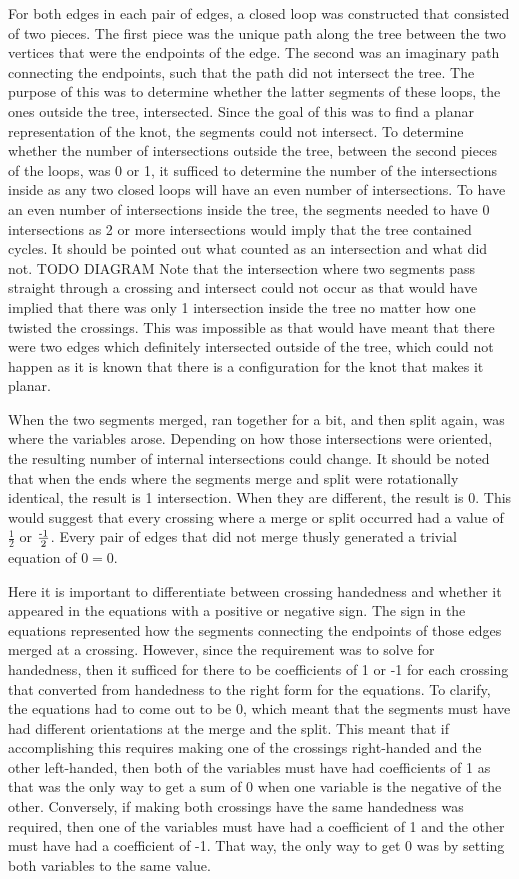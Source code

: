 \begin{paper}
For both edges in each pair of edges, a closed loop was constructed that
consisted of two pieces.
The first piece was the unique path along the tree between the two vertices that
were the endpoints of the edge.
The second was an imaginary path connecting the endpoints, such that the path
did not intersect the tree.
The purpose of this was to determine whether the latter segments of these loops,
the ones outside the tree, intersected.
Since the goal of this was to find a planar representation of the knot, the
segments could not intersect.
To determine whether the number of intersections outside the tree, between the
second pieces of the loops, was 0 or 1, it sufficed to determine the number of
the intersections inside as any two closed loops will have an even number of
intersections.
To have an even number of intersections inside the tree, the segments needed to
have 0 intersections as 2 or more intersections would imply that the tree
contained cycles.
It should be pointed out what counted as an intersection and what did not. TODO
DIAGRAM
Note that the intersection where two segments pass straight through a crossing
and intersect could not occur as that would have implied that there was only 1
intersection inside the tree no matter how one twisted the crossings.
This was impossible as that would have meant that there were two edges which
definitely intersected outside of the tree, which could not happen as it is
known that there is a configuration for the knot that makes it planar.

When the two segments merged, ran together for a bit, and then split again, was
where the variables arose.
Depending on how those intersections were oriented, the resulting number of
internal intersections could change.
It should be noted that when the ends where the segments merge and split were
rotationally identical, the result is 1 intersection.
When they are different, the result is 0.
This would suggest that every crossing where a merge or split occurred had a
value of $\frac12$ or $\frac{\text-1}2$.
Every pair of edges that did not merge thusly generated a trivial equation of
$0=0$.

Here it is important to differentiate between crossing handedness and whether it
appeared in the equations with a positive or negative sign.
The sign in the equations represented how the segments connecting the endpoints
of those edges merged at a crossing.
However, since the requirement was to solve for handedness, then it sufficed for
there to be coefficients of 1 or -1 for each crossing that converted from
handedness to the right form for the equations.
To clarify, the equations had to come out to be 0, which meant that the segments
must have had different orientations at the merge and the split.
This meant that if accomplishing this requires making one of the crossings
right-handed and the other left-handed, then both of the variables must have had
coefficients of 1 as that was the only way to get a sum of 0 when one variable
is the negative of the other.
Conversely, if making both crossings have the same handedness was required, then
one of the variables must have had a coefficient of 1 and the other must have
had a coefficient of -1.
That way, the only way to get 0 was by setting both variables to the same value.


\end{paper}
